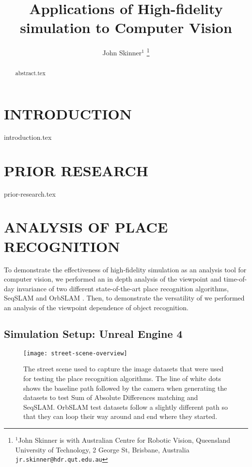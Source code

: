 \documentclass[letterpaper, 10 pt, conference]{ieeeconf}  %
\title{\LARGE \bf
Applications of High-fidelity simulation to Computer Vision
}
\author{John Skinner$^{1}$%
\thanks{$^{1}$John Skinner is with Australian Centre for Robotic Vision,
        Queensland University of Technology,
        2 George St, Brisbane, Australia
        {\tt\small jr.skinner@hdr.qut.edu.au}}%
}
\begin{document}
\maketitle
\thispagestyle{empty}
\pagestyle{empty}


\begin{abstract}

{abstract.tex}

\end{abstract}


\section{INTRODUCTION}

{introduction.tex}

\section{PRIOR RESEARCH}

{prior-research.tex}

\section{ANALYSIS OF PLACE RECOGNITION}

To demonstrate the effectiveness of high-fidelity simulation as an analysis tool for computer vision, we performed an in depth analysis of the viewpoint and time-of-day invariance of two different state-of-the-art place recognition algorithms, SeqSLAM \cite{Milford2012} and OrbSLAM \cite{Montiel2015}. Then, to demonstrate the versatility of we performed an analysis of the viewpoint dependence of object recognition.

\subsection{Simulation Setup: Unreal Engine 4}

\begin{figure*}[t]
    \texttt{[image: street-scene-overview]}
    \caption{The street scene used to capture the image datasets that were used for testing the place recognition algorithms. The line of white dots shows the baseline path followed by the camera when generating the datasets to test Sum of Absolute Differences matching and SeqSLAM. OrbSLAM test datasets follow a slightly different path so that they can loop their way around and end where they started.}
    \label{fig:street-scene-overview}
\end{figure*}
\end{document}

